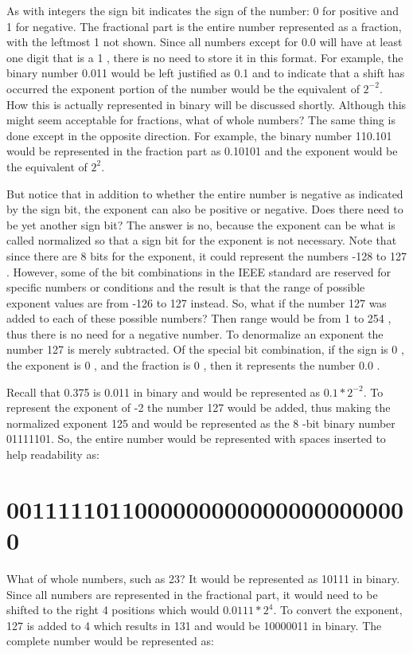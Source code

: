 \documentclass[10pt]{article}
\begin{document}
As with integers the sign bit indicates the sign of the number: 0 for positive and 1 for negative. The fractional part is the entire number represented as a fraction, with the leftmost 1 not shown. Since all numbers except for 0.0 will have at least one digit that is a 1 , there is no need to store it in this format. For example, the binary number 0.011 would be left justified as 0.1 and to indicate that a shift has occurred the exponent portion of the number would be the equivalent of $2^{-2}$. How this is actually represented in binary will be discussed shortly. Although this might seem acceptable for fractions, what of whole numbers? The same thing is done except in the opposite direction. For example, the binary number 110.101 would be represented in the fraction part as 0.10101 and the exponent would be the equivalent of $2^{2}$.

But notice that in addition to whether the entire number is negative as indicated by the sign bit, the exponent can also be positive or negative. Does there need to be yet another sign bit? The answer is no, because the exponent can be what is called normalized so that a sign bit for the exponent is not necessary. Note that since there are 8 bits for the exponent, it could represent the numbers -128 to 127 . However, some of the bit combinations in the IEEE standard are reserved for specific numbers or conditions and the result is that the range of possible exponent values are from -126 to 127 instead. So, what if the number 127 was added to each of these possible numbers? Then range would be from 1 to 254 , thus there is no need for a negative number. To denormalize an exponent the number 127 is merely subtracted. Of the special bit combination, if the sign is 0 , the exponent is 0 , and the fraction is 0 , then it represents the number 0.0 .

Recall that 0.375 is 0.011 in binary and would be represented as $0.1 * 2^{-2}$. To represent the exponent of -2 the number 127 would be added, thus making the normalized exponent 125 and would be represented as the 8 -bit binary number 01111101. So, the entire number would be represented with spaces inserted to help readability as:

\section*{00111110110000000000000000000000}
What of whole numbers, such as 23? It would be represented as 10111 in binary. Since all numbers are represented in the fractional part, it would need to be shifted to the right 4 positions which would $0.0111 * 2^{4}$. To convert the exponent, 127 is added to 4 which results in 131 and would be 10000011 in binary. The complete number would be represented as:
\end{document}
